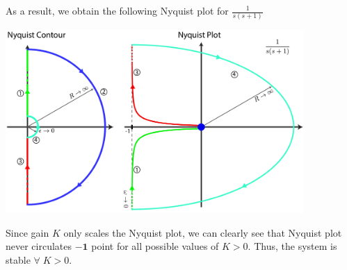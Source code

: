 \documentclass{article}
\begin{document}
As a result, we obtain the following Nyquist plot for
$ \frac{1}{s (s+1)}$

\vspace{6 pt}

  \begin{minipage}[h]{1\linewidth}
    \begin{center}
      \includegraphics[width=0.85\textwidth]{figs/ex5}
    \end{center}
  \end{minipage}

\vspace{6 pt}

Since gain $K$ only scales the Nyquist plot, we can clearly see that 
Nyquist plot never circulates $\mathbf{-1}$ point for all possible values of $K > 0$.
Thus, the system is stable $\forall \; K > 0$.
 
\end{document}
